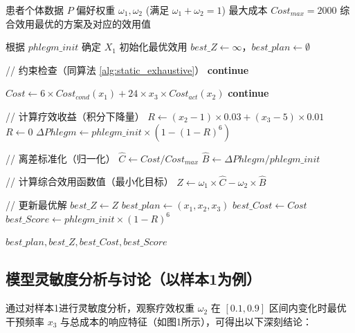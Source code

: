 \documentclass[12pt,a4paper]{article}
\begin{document}
\begin{algorithm}[H]
\caption{基于综合效用的多目标权衡模型}
\label{alg:utility_optimization}
\begin{algorithmic}[1]
\REQUIRE 患者个体数据 $P$
\REQUIRE 偏好权重 $\omega_1, \omega_2$ (满足 $\omega_1+\omega_2=1$)
\REQUIRE 最大成本 $Cost_{max} = 2000$
\ENSURE 综合效用最优的方案及对应的效用值

\STATE 根据 $phlegm\_init$ 确定 $X_1$
\STATE 初始化最优效用 $best\_Z \gets \infty$，$best\_plan \gets \emptyset$

            \STATE // 约束检查（同算法 \ref{alg:static_exhaustive}）
                \STATE \textbf{continue}
            \ENDIF
            
            \STATE $Cost \gets 6 \times Cost_{cond}(x_1) + 24 \times x_3 \times Cost_{act}(x_2)$
                \STATE \textbf{continue}
            \ENDIF
            
            \STATE // 计算疗效收益（积分下降量）
                \STATE $R \gets (x_2 - 1) \times 0.03 + (x_3 - 5) \times 0.01$
            \ELSE
                \STATE $R \gets 0$
            \ENDIF
            \STATE $\Delta Phlegm \gets phlegm\_init \times (1 - (1 - R)^6)$
            
            \STATE // 离差标准化（归一化）
            \STATE $\hat{C} \gets Cost / Cost_{max}$
            \STATE $\hat{B} \gets \Delta Phlegm / phlegm\_init$
            
            \STATE // 计算综合效用函数值（最小化目标）
            \STATE $Z \gets \omega_1 \times \hat{C} - \omega_2 \times \hat{B}$
            
            \STATE // 更新最优解
                \STATE $best\_Z \gets Z$
                \STATE $best\_plan \gets (x_1, x_2, x_3)$
                \STATE $best\_Cost \gets Cost$
                \STATE $best\_Score \gets phlegm\_init \times (1 - R)^6$
            \ENDIF
        \ENDFOR
    \ENDFOR
\ENDFOR

\RETURN $best\_plan, best\_Z, best\_Cost, best\_Score$
\end{algorithmic}
\end{algorithm}

\subsection{模型灵敏度分析与讨论（以样本1为例）}
通过对样本1进行灵敏度分析，观察疗效权重 $\omega_2$ 在 $[0.1, 0.9]$ 区间内变化时最优干预频率 $x_3$ 与总成本的响应特征（如图1所示），可得出以下深刻结论：
\end{document}
